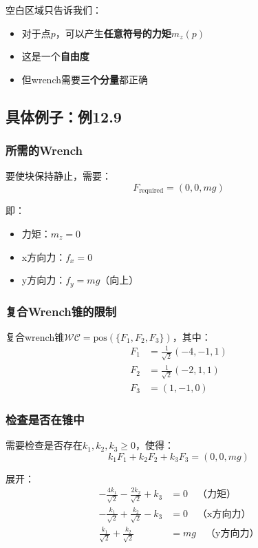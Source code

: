 \documentclass[12pt,a4paper]{article}
\begin{document}
空白区域只告诉我们：
\begin{itemize}
    \item 对于点$p$，可以产生\textbf{任意符号的力矩}$m_z(p)$
    \item 这是一个\textbf{自由度}
    \item 但wrench需要\textbf{三个分量}都正确
\end{itemize}

\subsection{具体例子：例12.9}

\subsubsection{所需的Wrench}

要使块保持静止，需要：
\begin{equation}
F_{\text{required}} = (0, 0, mg)
\end{equation}

即：
\begin{itemize}
    \item 力矩：$m_z = 0$
    \item x方向力：$f_x = 0$
    \item y方向力：$f_y = mg$（向上）
\end{itemize}

\subsubsection{复合Wrench锥的限制}

复合wrench锥$\mathcal{WC} = \text{pos}(\{F_1, F_2, F_3\})$，其中：
\begin{align}
F_1 &= \frac{1}{\sqrt{2}}(-4, -1, 1) \\
F_2 &= \frac{1}{\sqrt{2}}(-2, 1, 1) \\
F_3 &= (1, -1, 0)
\end{align}

\subsubsection{检查是否在锥中}

需要检查是否存在$k_1, k_2, k_3 \geq 0$，使得：
\begin{equation}
k_1 F_1 + k_2 F_2 + k_3 F_3 = (0, 0, mg)
\end{equation}

展开：
\begin{align}
-\frac{4k_1}{\sqrt{2}} - \frac{2k_2}{\sqrt{2}} + k_3 &= 0 \quad \text{（力矩）} \\
-\frac{k_1}{\sqrt{2}} + \frac{k_2}{\sqrt{2}} - k_3 &= 0 \quad \text{（x方向力）} \\
\frac{k_1}{\sqrt{2}} + \frac{k_2}{\sqrt{2}} &= mg \quad \text{（y方向力）}
\end{align}
\end{document}

